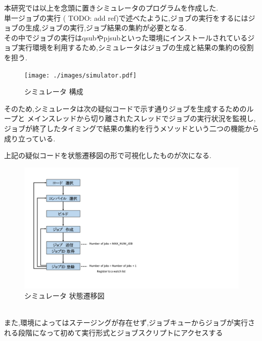 本研究では以上を念頭に置きシミュレータのプログラムを作成した.\\
単一ジョブの実行 ( TODO: add ref)で述べたように,ジョブの実行をするにはジョブの生成,ジョブの実行,ジョブ結果の集約が必要となる.\\
その中でジョブの実行はqsubやpjsubといった環境にインストールされているジョブ実行環境を利用するため,シミュレータはジョブの生成と結果の集約の役割を担う.~\\
\begin{figure}[htb]
  \begin{center}
    \texttt{[image: ./images/simulator.pdf]}
    \caption{シミュレータ 構成}
    \label{fig:simulator}
  \end{center}
\end{figure}
そのため,シミュレータは次の疑似コードで示す通りジョブを生成するためのループと
メインスレッドから切り離されたスレッドでジョブの実行状況を監視し,
ジョブが終了したタイミングで結果の集約を行うメソッドという二つの機能から成り立っている.~\\
{\footnotesize

}
上記の疑似コードを状態遷移図の形で可視化したものが次になる.\\
\begin{figure}[htb]
  \begin{center}
    \includegraphics[width=20.0cm]{./images/state.pdf}
    \caption{シミュレータ 状態遷移図}
    \label{fig:simulator-state}
  \end{center}
\end{figure}
~\\
また,環境によってはステージングが存在せず,ジョブキューからジョブが実行される段階になって初めて実行形式とジョブスクリプトにアクセスする
